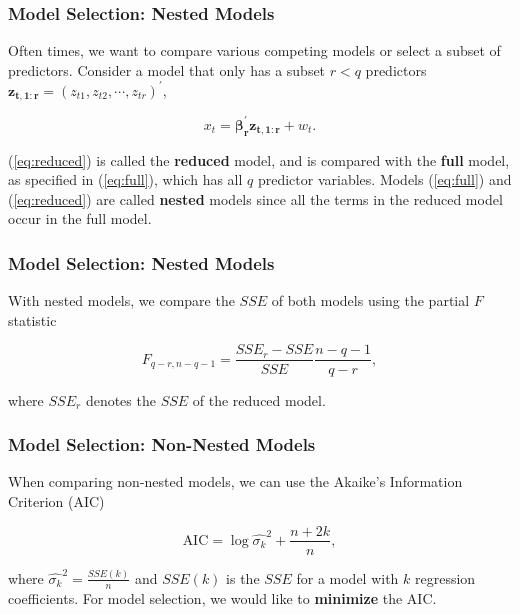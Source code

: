 \documentclass[%
xcolor=pdftex]{beamer}
\begin{document}
\begin{frame}
\frametitle{Model Selection: Nested Models}

Often times, we want to compare various competing models or select a subset of predictors. Consider a model that only has a subset $r < q$ predictors $\boldsymbol{z_{t,1:r}} = (z_{t1},z_{t2},\cdots,z_{tr})^{\prime}$,

\begin{equation} \label{eq:reduced}
x_t = \boldsymbol{\beta_r^{\prime}z_{t,1:r}} + w_t.
\end{equation}

(\ref{eq:reduced}) is called the \textbf{reduced} model, and is compared with the \textbf{full} model, as specified in (\ref{eq:full}), which has all $q$ predictor variables. Models (\ref{eq:full}) and (\ref{eq:reduced}) are called \textbf{nested} models since all the terms in the reduced model occur in the full model.

\end{frame}

\begin{frame}
\frametitle{Model Selection: Nested Models}

With nested models, we compare the $SSE$ of both models using the partial $F$ statistic

\begin{equation}
F_{q-r,n-q-1} = \frac{SSE_r - SSE}{SSE} \frac{n-q-1}{q-r},
\end{equation}

where $SSE_r$ denotes the $SSE$ of the reduced model.

\end{frame}

\begin{frame}
\frametitle{Model Selection: Non-Nested Models}

When comparing non-nested models, we can use the Akaike's Information Criterion (AIC)

\begin{equation}
\mbox{AIC} = \log \hat{\sigma_k}^2+\frac{n+2k}{n},
\end{equation}

where $\hat{\sigma_k}^2 = \frac{SSE(k)}{n}$ and $SSE(k)$ is the $SSE$ for a model with $k$ regression coefficients. For model selection, we would like to \textbf{minimize} the AIC.

\end{frame}
\end{document}
